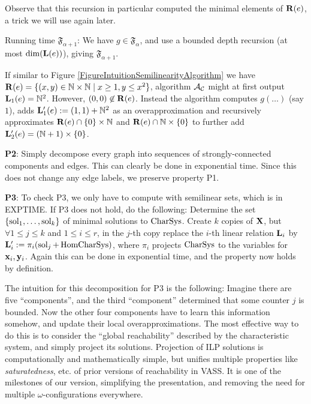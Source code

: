 Observe that this recursion in particular computed the minimal elements of \(\mathbf{R}(e)\), a trick we will use again later.

Running time \(\mathfrak{F}_{\alpha+1}\): We have \(g \in \mathfrak{F}_{\alpha}\), and use a bounded depth recursion (at most \(\dim(\mathbf{L}(e))\)), giving \(\mathfrak{F}_{\alpha+1}\).

\begin{example}
If similar to Figure \ref{FigureIntuitionSemilinearityAlgorithm} we have \(\mathbf{R}(e)=\{(x,y) \in \mathbb{N} \times \mathbb{N} \mid x \geq 1, y \leq x^2\}\), algorithm \(\mathcal{A}_{\mathcal{C}}\) might at first output \(\mathbf{L}_1(e)=\mathbb{N}^2\). However, \((0,0) \not \in \mathbf{R}(e)\). Instead the algorithm computes \(g(\dots)\) (say \(1\)), adds \(\mathbf{L}_1'(e):=(1,1)+\mathbb{N}^2\) as an overapproximation and recursively approximates \(\mathbf{R}(e) \cap \{0\} \times \mathbb{N}\) and \(\mathbf{R}(e) \cap \mathbb{N} \times \{0\}\) to further add \(\mathbf{L}_2'(e)=(\mathbb{N}+1) \times \{0\}\).
\end{example}

\textbf{P2}: Simply decompose every graph into sequences of strongly-connected components and edges. This can clearly be done in exponential time. Since this does not change any edge labels, we preserve property P1.

\textbf{P3}: To check P3, we only have to compute with semilinear sets, which is in EXPTIME. If P3 does not hold, do the following: Determine the set \(\{\operatorname{sol}_1, \dots, \operatorname{sol}_k\}\) of minimal solutions to \(\operatorname{CharSys}\). Create \(k\) copies of \(\mathbf{X}\), but \(\forall 1 \leq j \leq k\) and \(1 \leq i \leq r\), in the \(j\)-th copy replace the \(i\)-th linear relation \(\mathbf{L}_i\) by \(\mathbf{L}_i':=\pi_i(\operatorname{sol}_j+\operatorname{HomCharSys})\), where \(\pi_i\) projects \(\operatorname{CharSys}\) to the variables for \(\mathbf{x}_i, \mathbf{y}_i\). Again this can be done in exponential time, and the property now holds by definition.

The intuition for this decomposition for P3 is the following: Imagine there are five ``components'', and the third ``component'' determined that some counter \(j\) is bounded. Now the other four components have to learn this information somehow, and update their local overapproximations. The most effective way to do this is to consider the ``global reachability'' described by the characteristic system, and simply project its solutions. Projection of ILP solutions is computationally and mathematically simple, but unifies multiple properties like \emph{saturatedness}, etc. of prior versions of reachability in VASS. It is one of the milestones of our version, simplifying the presentation, and removing the need for multiple \(\omega\)-configurations everywhere.

